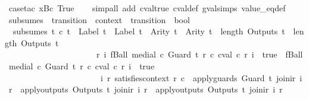 \begin{isabellebody}
\ {\isacharparenleft}case{\isacharunderscore}tac\ {\isachardoublequoteopen}x{\isacharequal}Bc\ True{\isachardoublequoteclose}{\isacharparenright}\isanewline
\ \ \isamarkupfalse%
\ {\isacharparenleft}simp{\isacharunderscore}all\ add{\isacharcolon}\ cval{\isacharunderscore}true\ cval{\isacharunderscore}def\ gval{\isachardot}simps\ value_eq{\isacharunderscore}def{\isacharparenright}%
\endisatagproof
{\isafoldproof}%
%
\isadelimproof
\isanewline
%
\endisadelimproof
\isanewline
\isanewline
{}\isamarkupfalse%
\ subsumes\ {\isacharcolon}{\isacharcolon}\ {\isachardoublequoteopen}transition\ {\isasymRightarrow}\ context\ {\isasymRightarrow}\ transition\ {\isasymRightarrow}\ bool{\isachardoublequoteclose}\ {\isacharparenleft}{\isachardoublequoteopen}{\isacharunderscore}\isactrlsub {\isacharunderscore}{\isasymsqsupseteq}{\isacharunderscore}{\isachardoublequoteclose}\ {}{}{\isacharparenright}\ \ \isanewline
\ \ {\isachardoublequoteopen}subsumes\ t{}\ c\ t{}\ {\isasymequiv}\ Label\ t{}\ {\isacharequal}\ Label\ t{}\ {\isasymand}\ Arity\ t{}\ {\isacharequal}\ Arity\ t{}\ {\isasymand}\ length\ {\isacharparenleft}Outputs\ t{}{\isacharparenright}\ {\isacharequal}\ length\ {\isacharparenleft}Outputs\ t{}{\isacharparenright}\ {\isasymand}\isanewline
\ \ \ \ \ \ \ \ \ \ \ \ \ \ \ \ \ \ \ \ \ \ {\isacharparenleft}{\isasymforall}r\ i{\isachardot}\ fBall\ {\isacharparenleft}medial\ c\ {\isacharparenleft}Guard\ t{}{\isacharparenright}\ r{\isacharparenright}\ {\isacharparenleft}{\isasymlambda}c{\isachardot}\ cval\ c\ r\ i\ {\isacharequal}\ true{\isacharparenright}\ {\isasymlongrightarrow}\ fBall\ {\isacharparenleft}medial\ c\ {\isacharparenleft}Guard\ t{}{\isacharparenright}\ r{\isacharparenright}\ {\isacharparenleft}{\isasymlambda}c{\isachardot}\ cval\ c\ r\ i\ {\isacharequal}\ true{\isacharparenright}{\isacharparenright}\ {\isasymand}\isanewline
\ \ \ \ \ \ \ \ \ \ \ \ \ \ \ \ \ \ \ \ \ \ {\isacharparenleft}{\isasymforall}\ i\ r{\isachardot}\ satisfies{\isacharunderscore}context\ r\ c\ {\isasymlongrightarrow}\ apply{\isacharunderscore}guards\ {\isacharparenleft}Guard\ t{}{\isacharparenright}\ {\isacharparenleft}join{\isacharunderscore}ir\ i\ r{\isacharparenright}\ {\isasymlongrightarrow}\ apply{\isacharunderscore}outputs\ {\isacharparenleft}Outputs\ t{}{\isacharparenright}\ {\isacharparenleft}join{\isacharunderscore}ir\ i\ r{\isacharparenright}\ {\isacharequal}\ apply{\isacharunderscore}outputs\ {\isacharparenleft}Outputs\ t{}{\isacharparenright}\ {\isacharparenleft}join{\isacharunderscore}ir\ i\ r{\isacharparenright}{\isacharparenright}\ {\isasymand}\isanewline

\end{isabellebody}

